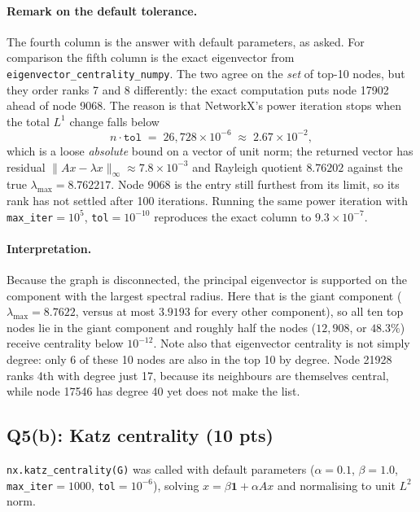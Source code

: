 \paragraph{Remark on the default tolerance.}
The fourth column is the answer with default parameters, as asked. For comparison
the fifth column is the exact eigenvector from
\texttt{eigenvector\_\-centrality\_\-numpy}. The two agree on the \emph{set} of
top-10 nodes, but they order ranks 7 and 8 differently: the exact computation puts
node 17902 ahead of node 9068. The reason is that NetworkX's power iteration stops
when the total $L^1$ change falls below
\[
  n\cdot\texttt{tol} \;=\; 26{,}728\times10^{-6} \;\approx\; 2.67\times10^{-2},
\]
which is a loose \emph{absolute} bound on a vector of unit norm; the returned
vector has residual $\lVert Ax-\lambda x\rVert_\infty\approx7.8\times10^{-3}$ and
Rayleigh quotient $8.76202$ against the true
$\lambda_{\max}=8.762217$. Node 9068 is the entry still
furthest from its limit, so its rank has not settled after 100 iterations. Running
the same power iteration with \texttt{max\_iter}$=10^5$, \texttt{tol}$=10^{-10}$
reproduces the exact column to $9.3\times10^{-7}$.

\paragraph{Interpretation.}
Because the graph is disconnected, the principal eigenvector is supported on the
component with the largest spectral radius. Here that is the giant component
($\lambda_{\max}=8.7622$, versus at most $3.9193$ for every other component), so all
ten top nodes lie in the giant component and roughly half the nodes
($12{,}908$, or $48.3\%$) receive centrality below $10^{-12}$. Note also that
eigenvector centrality is not simply degree: only 6 of these 10 nodes are also in
the top 10 by degree. Node 21928 ranks 4th with degree just 17, because its
neighbours are themselves central, while node 17546 has degree 40 yet does not
make the list.

\subsection*{Q5(b): Katz centrality (10 pts)}

\texttt{nx.katz\_centrality(G)} was called with default parameters
($\alpha=0.1$, $\beta=1.0$, \texttt{max\_iter}$=1000$, \texttt{tol}$=10^{-6}$),
solving $x=\beta\mathbf{1}+\alpha Ax$ and normalising to unit $L^2$ norm.

